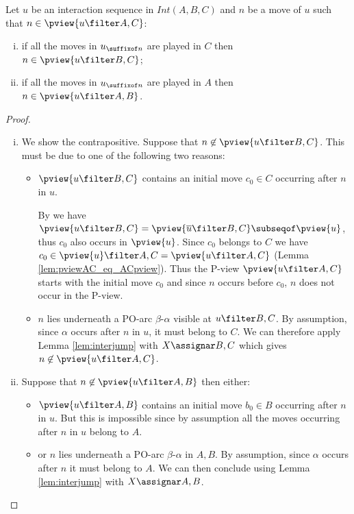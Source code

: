 \begin{lemma}
\label{lem:in_pviewAC_imp_in_pviewX}
Let $u$ be an interaction sequence in $Int(A,B,C)$ and
$n$ be a move of $u$ such that $n\in\pview{u \filter A,C}$:
\begin{enumerate}[i.]
\item 
if all the moves in $u_{\suffixof n}$ 
are played in $C$  then $n \in \pview{u \filter B,C}$;
\item 
if all the moves in $u_{\suffixof n}$ are played in $A$ then $n \in \pview{u \filter A,B}$.
\end{enumerate}
\end{lemma}
\begin{proof}
\begin{enumerate}[(i)]
\item
We show the contrapositive. Suppose that $n \not\in\pview{u \filter B,C}$. This must be due to one of the following  two
reasons:
\begin{itemize}[-]
\item $\pview{u \filter B,C}$ contains an initial move $c_0 \in C$
occurring after $n$ in $u$.


By \cite[Lemma 3.3.1]{Harmer2005}
we have $\pview{u \filter B,C} = \pview{\overline{u} \filter B,C} \subseqof \pview{u}$, thus $c_0$ also occurs in $\pview{u}$.
Since $c_0$ belongs to $C$ we have
$c_0 \in \pview{u} \filter A,C=
\pview{u \filter A,C}$ (Lemma \ref{lem:pviewAC_eq_ACpview}).
Thus the P-view $\pview{u \filter A,C}$
starts with the initial move $c_0$ and
since $n$ occurs before $c_0$, $n$ does not occur in the P-view.

\item $n$ lies underneath a PO-arc $\beta$-$\alpha$ visible 
at $ u \filter B,C$.
By assumption, since $\alpha$ occurs after $n$ in $u$, it must belong to $C$. We can therefore apply Lemma \ref{lem:interjump}
with $X\assignar B,C$ which gives
$n \not\in\pview{u \filter A,C}$.
\end{itemize}

\item Suppose that $n \not\in\pview{u \filter A,B}$ then either:
\begin{itemize}[-]
\item $\pview{u \filter A,B}$ contains an initial move $b_0 \in B$
occurring after $n$ in $u$. But this is impossible since by assumption all the moves occurring after $n$ in $u$ belong to $A$.

\item or $n$ lies underneath a PO-arc $\beta$-$\alpha$ in $A,B$.
By assumption, since $\alpha$ occurs after $n$ it must belong to $A$. We can then conclude using 
Lemma \ref{lem:interjump} with $X\assignar A,B$.
\end{itemize}
\end{enumerate}
\end{proof}

